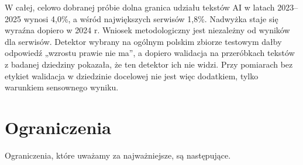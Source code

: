 \documentclass[11pt,a4paper]{article}
\begin{document}
W całej, celowo dobranej próbie dolna granica udziału tekstów AI w latach 2023--2025 wynosi 4,0\%, a wśród największych serwisów 1,8\%. Nadwyżka staje się wyraźna dopiero w 2024 r. Wniosek metodologiczny jest niezależny od wyników dla serwisów. Detektor wybrany na ogólnym polskim zbiorze testowym dałby odpowiedź „wzrostu prawie nie ma”, a dopiero walidacja na przeróbkach tekstów z badanej dziedziny pokazała, że ten detektor ich nie widzi. Przy pomiarach bez etykiet walidacja w dziedzinie docelowej nie jest więc dodatkiem, tylko warunkiem sensownego wyniku.

\section{Ograniczenia}\label{sec:ograniczenia}

Ograniczenia, które uważamy za najważniejsze, są następujące.
\end{document}
